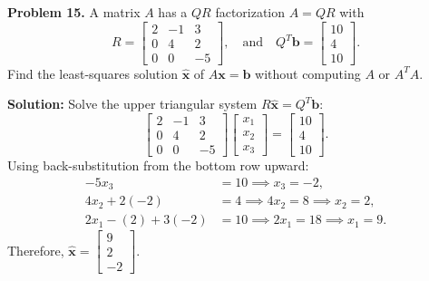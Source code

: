 \documentclass[11pt, letterpaper]{article}
\theoremstyle{definition}
\theoremstyle{remark}
\begin{document}
\textbf{Problem 15.} A matrix $A$ has a $QR$ factorization $A = QR$ with
\[
R = \begin{bmatrix} 2 & -1 & 3 \\ 0 & 4 & 2 \\ 0 & 0 & -5 \end{bmatrix}, \quad \text{and} \quad Q^T \mathbf{b} = \begin{bmatrix} 10 \\ 4 \\ 10 \end{bmatrix}.
\]
Find the least-squares solution $\hat{\mathbf{x}}$ of $A\mathbf{x} = \mathbf{b}$ without computing $A$ or $A^T A$.

\textbf{Solution:} Solve the upper triangular system $R\hat{\mathbf{x}} = Q^T \mathbf{b}$:
\[
\begin{bmatrix} 2 & -1 & 3 \\ 0 & 4 & 2 \\ 0 & 0 & -5 \end{bmatrix} \begin{bmatrix} x_1 \\ x_2 \\ x_3 \end{bmatrix} = \begin{bmatrix} 10 \\ 4 \\ 10 \end{bmatrix}.
\]
Using back-substitution from the bottom row upward:
\begin{align*}
-5x_3 &= 10 \implies x_3 = -2, \\
4x_2 + 2(-2) &= 4 \implies 4x_2 = 8 \implies x_2 = 2, \\
2x_1 - (2) + 3(-2) &= 10 \implies 2x_1 = 18 \implies x_1 = 9.
\end{align*}
Therefore, $\hat{\mathbf{x}} = \begin{bmatrix} 9 \\ 2 \\ -2 \end{bmatrix}$.
\end{document}
